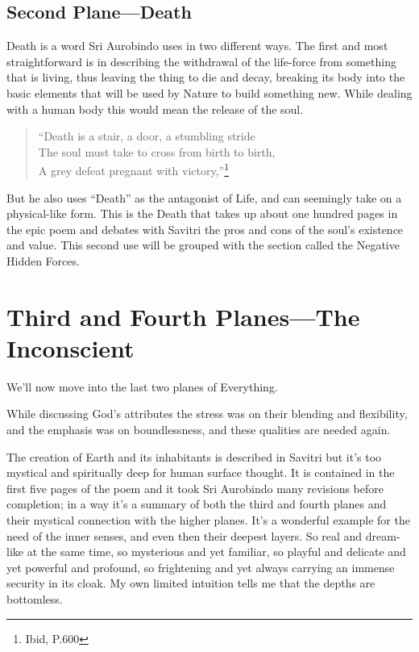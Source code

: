 \documentclass[12pt,a4paper]{book}
\begin{document}
\newpage
\begin{center}\section*{Second Plane---Death}\end{center}

Death is a word Sri Aurobindo uses in two different ways. The first
and most straightforward is in describing the withdrawal of the
life-force from something that is living, thus leaving the thing to
die and decay, breaking its body into the basic elements that will be
used by Nature to build something new. While dealing with a human body
this would mean the release of the soul.

\begin{verse}
``Death is a stair, a door, a stumbling stride\\
The soul must take to cross from birth to birth,\\
A grey defeat pregnant with victory,''\footnote{Ibid, P.600}
\end{verse}

But he also uses ``Death'' as the antagonist of Life, and can
seemingly take on a physical-like form. This is the Death that takes
up about one hundred pages in the epic poem and debates with Savitri
the pros and cons of the soul's existence and value. This second use
will be grouped with the section called the Negative Hidden Forces.


\newpage
\section*{Third and Fourth Planes---The Inconscient}

We'll now move into the last two planes of Everything.

While discussing God's attributes the stress was on their blending and
flexibility, and the emphasis was on boundlessness, and these
qualities are needed again.

The creation of Earth and its inhabitants is described in Savitri but
it's too mystical and spiritually deep for human surface thought. It
is contained in the first five pages of the poem and it took Sri
Aurobindo many revisions before completion; in a way it's a summary of
both the third and fourth planes and their mystical connection with
the higher planes. It's a wonderful example for the need of the inner
senses, and even then their deepest layers. So real and dream-like at
the same time, so mysterious and yet familiar, so playful and delicate
and yet powerful and profound, so frightening and yet always carrying
an immense security in its cloak. My own limited intuition tells me
that the depths are bottomless.
\end{document}
